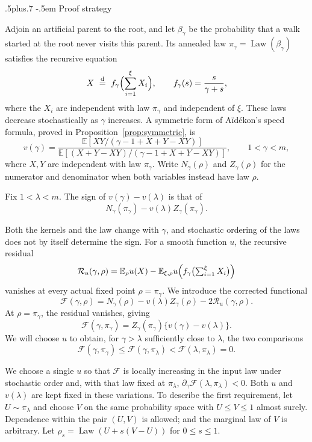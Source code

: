 \documentclass[11pt,reqno]{amsart}
\makeatletter
\def\subsection{\@startsection{subsection}{2}{0pt}%
  {.5\linespacing plus.7\linespacing}
  {-.5em}
  {\normalfont\scshape}}
\theoremstyle{plain}
\theoremstyle{definition}
\theoremstyle{remark}
\numberwithin{equation}{section}
\newcommand{\E}{\mathbb E}
\newcommand{\Law}{\operatorname{Law}}
\newcommand{\cF}{\mathcal F}
\newcommand{\res}{\mathcal R}
\makeatother
\begin{document}
\subsection{Proof strategy}

Adjoin an artificial parent to the root, and let $\beta_\gamma$ be the
probability that a walk started at the root never visits this parent. Its
annealed law $\pi_\gamma=\Law(\beta_\gamma)$ satisfies the recursive equation
\[
 X\ \overset{\mathrm d}=\ f_\gamma\Bigl(\sum_{i=1}^{\xi}X_i\Bigr),
 \qquad f_\gamma(s)=\frac{s}{\gamma+s},
\]
where the $X_i$ are independent with law $\pi_\gamma$ and independent of
$\xi$. These laws decrease stochastically as $\gamma$ increases. A
symmetric form of A\"id\'ekon's speed formula, proved in
Proposition~\ref{prop:symmetric}, is
\begin{equation}\label{eq:roadmap-speed}
 v(\gamma)
 =\frac{\E[XY/(\gamma-1+X+Y-XY)]}
        {\E[(X+Y-XY)/(\gamma-1+X+Y-XY)]},
 \qquad 1<\gamma<m,
\end{equation}
where $X,Y$ are independent with law $\pi_\gamma$. Write
$N_\gamma(\rho)$ and $Z_\gamma(\rho)$ for the numerator and denominator
when both variables instead have law $\rho$.

Fix $1<\lambda<m$. The sign of $v(\gamma)-v(\lambda)$ is that of
\[N_\gamma(\pi_\gamma)-v(\lambda)Z_\gamma(\pi_\gamma).\]

Both the kernels and the
law change with $\gamma$, and stochastic ordering of the laws does not
by itself determine the sign. For a smooth function $u$, the recursive
residual
\begin{equation}\label{eq:roadmap-residual}
 \res_u(\gamma,\rho)
 =\E_\rho u(X)-\E_{\xi,\rho}
   u\Bigl(f_\gamma\bigl(\textstyle\sum_{i=1}^{\xi}X_i\bigr)\Bigr)
\end{equation}
vanishes at every actual fixed point $\rho=\pi_\gamma$. We introduce the
corrected functional
\begin{equation}
  \cF(\gamma,\rho)=N_\gamma(\rho)-v(\lambda)Z_\gamma(\rho)-2\res_u(\gamma,\rho).
\end{equation}
At $\rho=\pi_\gamma$, the residual vanishes, giving
\[
 \cF(\gamma,\pi_\gamma)
 =Z_\gamma(\pi_\gamma)\{v(\gamma)-v(\lambda)\}.
\]
We will choose $u$ to obtain, for $\gamma>\lambda$ sufficiently close to
$\lambda$, the two comparisons
\[
 \cF(\gamma,\pi_\gamma)
 \le\cF(\gamma,\pi_\lambda)
 <\cF(\lambda,\pi_\lambda)=0.
\] 

 
We choose a single $u$ so that $\cF$ is locally increasing in the input
law under stochastic order and, with that law fixed at $\pi_\lambda$,
$\partial_\gamma\cF(\lambda,\pi_\lambda)<0$. Both $u$ and $v(\lambda)$
are kept fixed in these variations.
To describe the first requirement, let $U\sim\pi_\lambda$
and choose $V$ on the same probability space with $U\le V\le1$ almost surely. Dependence within the pair $(U,V)$ is allowed; and the marginal law of $V$ is arbitrary.
  Let
$\rho_s=\Law(U+s(V-U))$ for $0\le s\le1$. 
\end{document}
